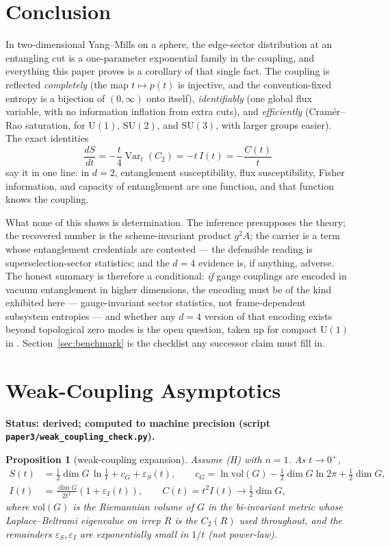 \documentclass[11pt]{article}
\newtheorem{proposition}[theorem]{Proposition}
\theoremstyle{remark}
\theoremstyle{plain}
\newcommand{\Var}{\operatorname{Var}}
\newcommand{\dG}{\dim G}
\begin{document}
\section{Conclusion}

In two-dimensional Yang--Mills on a sphere, the edge-sector distribution at an entangling cut is a one-parameter exponential family in the coupling, and everything this paper proves is a corollary of that single fact. The coupling is reflected \emph{completely} (the map $t \mapsto p(t)$ is injective, and the convention-fixed entropy is a bijection of $(0,\infty)$ onto itself), \emph{identifiably} (one global flux variable, with no information inflation from extra cuts), and \emph{efficiently} (Cram\'er--Rao saturation, for $\mathrm{U}(1)$, $\mathrm{SU}(2)$, and $\mathrm{SU}(3)$, with larger groups easier). The exact identities
\[
\frac{dS}{dt} = -\frac{t}{4}\Var_t(C_2) = -t\,I(t) = -\frac{C(t)}{t}
\]
say it in one line: in $d = 2$, entanglement susceptibility, flux susceptibility, Fisher information, and capacity of entanglement are one function, and that function knows the coupling.

What none of this shows is determination. The inference presupposes the theory; the recovered number is the scheme-invariant product $g^2 A$; the carrier is a term whose entanglement credentials are contested --- the defensible reading is superselection-sector statistics; and the $d = 4$ evidence is, if anything, adverse. The honest summary is therefore a conditional: \emph{if} gauge couplings are encoded in vacuum entanglement in higher dimensions, the encoding must be of the kind exhibited here --- gauge-invariant sector statistics, not frame-dependent subsystem entropies --- and whether any $d = 4$ version of that encoding exists beyond topological zero modes is the open question, taken up for compact $\mathrm{U}(1)$ in \cite{u1fourd}. Section~\ref{sec:benchmark} is the checklist any successor claim must fill in.

\appendix

\section{Weak-Coupling Asymptotics}\label{app:weak}

\textbf{Status: derived; computed to machine precision (script \texttt{paper3/weak\_coupling\_check.py}).}

\begin{proposition}[weak-coupling expansion]\label{prop:weak}
Assume (H) with $n = 1$. As $t \to 0^+$,
\begin{align}
S(t) &= \tfrac12\dG\,\ln\frac1t + c_G + \varepsilon_S(t), \qquad c_G = \ln \mathrm{vol}(G) - \tfrac12\dG\ln 2\pi + \tfrac12\dG, \label{eq:Sasymp}\\
I(t) &= \frac{\dG}{2t^2}\left(1 + \varepsilon_I(t)\right), \qquad C(t) = t^2 I(t) \to \tfrac12\dG, \label{eq:Iasymp}
\end{align}
where $\mathrm{vol}(G)$ is the Riemannian volume of $G$ in the bi-invariant metric whose Laplace--Beltrami eigenvalue on irrep $R$ is the $C_2(R)$ used throughout, and the remainders $\varepsilon_S, \varepsilon_I$ are exponentially small in $1/t$ (not power-law).
\end{proposition}
\end{document}
